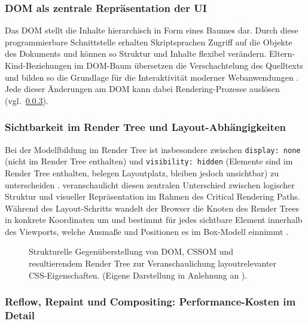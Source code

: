 \subsubsection{DOM als zentrale Repräsentation der UI}
\label{sss:dom}

Das DOM stellt die Inhalte hierarchisch in Form eines Baumes dar. Durch diese programmierbare Schnittstelle erhalten Skriptsprachen Zugriff auf die Objekte des Dokuments und können so Struktur und Inhalte flexibel verändern. Eltern-Kind-Beziehungen im DOM-Baum übersetzen die Verschachtelung des Quelltexts und bilden so die Grundlage für die Interaktivität moderner Webanwendungen \cite{mdn_dom_2026}. Jede dieser Änderungen am DOM kann dabei Rendering-Prozesse auslösen (vgl.\ \cref{sss:reflow-repaint-composite}).

\subsubsection{Sichtbarkeit im Render Tree und Layout-Abhängigkeiten}
\label{sss:visibility-render-tree-layout}

Bei der Modellbildung im Render Tree ist insbesondere zwischen \texttt{display: none} (nicht im Render Tree enthalten) und \texttt{visibility: hidden} (Elemente sind im Render Tree enthalten, belegen Layoutplatz, bleiben jedoch unsichtbar) zu unterscheiden \cite{web.dev_rclp_2014}. 
 veranschaulicht diesen zentralen Unterschied zwischen logischer Struktur und visueller Repräsentation im Rahmen des Critical Rendering Paths. Während des Layout-Schritts wandelt der Browser die Knoten des Render Trees in konkrete Koordinaten um und bestimmt für jedes sichtbare Element innerhalb des Viewports, welche Ausmaße und Positionen es im Box-Modell einnimmt \cite{web.dev_rclp_2014}.
\begin{figure}[htb]
	\centering
	\caption[Strukturelle Gegenüberstellung von DOM, CSSOM und Render Tree]{Strukturelle Gegenüberstellung von DOM, CSSOM und resultierendem Render Tree zur Veranschaulichung layoutrelevanter CSS-Eigenschaften. (Eigene Darstellung in Anlehnung an \cite{web.dev_rclp_2014}).}
	\label{fig:dom_cssom_render_tree}
\end{figure}

\subsubsection{Reflow, Repaint und Compositing: Performance-Kosten im Detail}
\label{sss:reflow-repaint-composite}

